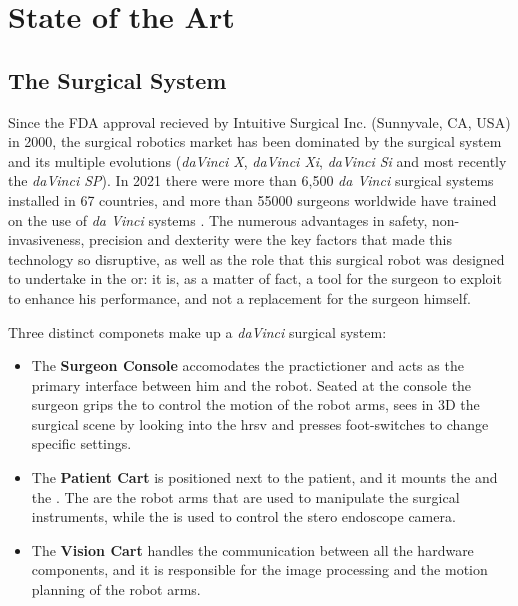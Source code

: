 \documentclass[../main.tex]{subfiles}
\begin{document}
\section{State of the Art}

\subsection{The \davinci Surgical System}
Since the FDA approval recieved by Intuitive Surgical Inc. (Sunnyvale, CA, USA) in 2000, the surgical robotics market has been dominated by the \davinci surgical system and its multiple evolutions (\textit{daVinci X}, \textit{daVinci Xi}, \textit{daVinci Si} and most recently the \textit{daVinci SP}). In 2021 there were more than 6,500 \textit{da Vinci} surgical systems installed in 67 countries, and more than 55000 surgeons worldwide have trained on the use of \textit{da Vinci} systems \cite{Intuitive2021}. The numerous advantages in safety, non-invasiveness, precision and dexterity were the key factors that made this technology so disruptive, as well as the role that this surgical robot was designed to undertake in the \ac{or}: it is, as a matter of fact, a tool for the surgeon to exploit to enhance his performance, and not a replacement for the surgeon himself.

Three distinct componets make up a \textit{daVinci} surgical system:
\begin{itemize}
    \item The \textbf{Surgeon Console} accomodates the practictioner and acts as the primary interface between him and the robot. Seated at the console the surgeon grips the \mtms to control the motion of the robot arms, sees in 3D the surgical scene by looking into the \ac{hrsv} and presses foot-switches to change specific settings.
    \item The \textbf{Patient Cart} is positioned next to the patient, and it mounts the \psms and the \ecm. The \psms are the robot arms that are used to manipulate the surgical instruments, while the \ecm is used to control the stero endoscope camera.
    \item The \textbf{Vision Cart} handles the communication between all the hardware components, and it is responsible for the image processing and the motion planning of the robot arms.
\end{itemize}
\end{document}
